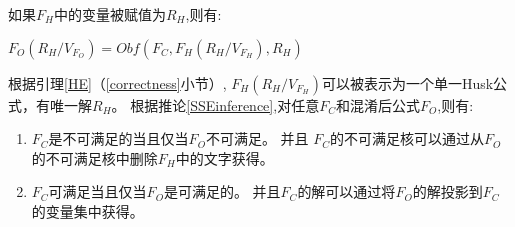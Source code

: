 %
%
%
%
%
%
%


如果$F_H$中的变量被赋值为$R_H$,则有:

$F_O(R_H/V_{F_O})
=Obf(F_C,F_H(R_H/V_{F_H}),R_H)$

根据引理\ref{HE}（\ref{correctness}小节）,
$F_H(R_H/V_{F_H})$可以被表示为一个单一Husk公式，有唯一解$R_H$。
根据推论\ref{SSEinference},对任意$F_C$和混淆后公式$F_O$,则有:
\begin{enumerate}
 \item $F_C$是不可满足的当且仅当$F_O$不可满足。
 并且 $F_C$的不可满足核可以通过从$F_O$的不可满足核中删除$F_H$中的文字获得。
 \item $F_C$可满足当且仅当$F_O$是可满足的。
 并且$F_C$的解可以通过将$F_O$的解投影到$F_C$的变量集中获得。
\end{enumerate}

